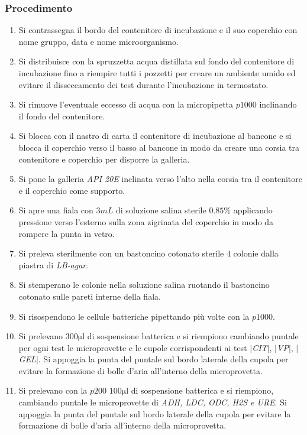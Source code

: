 		\subsubsection{Procedimento}
		\begin{enumerate}
			\item Si contrassegna il bordo del contenitore di incubazione e il suo coperchio con nome gruppo, data e nome microorganismo.
			\item Si distribuisce con la spruzzetta acqua distillata sul fondo del contenitore di incubazione fino a riempire tutti i pozzetti per creare un ambiente umido ed evitare il disseccamento dei test durante l'incubazione in termostato.
			\item Si rimuove l'eventuale eccesso di acqua con la micropipetta $p1000$ inclinando il fondo del contenitore.
			\item Si blocca con il nastro di carta il contenitore di incubazione al bancone e si blocca il coperchio verso il basso al bancone in modo da creare una corsia tra contenitore e coperchio per disporre la galleria.
			\item Si pone la galleria \emph{API 20E} inclinata verso l'alto nella corsia tra il contenitore e il coperchio come supporto.
			\item Si apre una fiala con $3\si{mL}$ di soluzione salina sterile $0.85\%$ applicando pressione verso l'esterno sulla zona zigrinata del coperchio in modo da rompere la punta in vetro.
			\item Si preleva sterilmente con un bastoncino cotonato sterile $4$ colonie dalla piastra di \emph{LB-agar}.
			\item Si stemperano le colonie nella soluzione salina ruotando il bastoncino cotonato sulle pareti interne della fiala.
			\item Si risospendono le cellule batteriche pipettando pi\`u volte con la $p1000$.
			\item Si prelevano $300\si{\micro\litre}$ di sospensione batterica e si riempiono cambiando puntale per ogni test le microprovette e le cupole corrispondenti ai test \emph{$|$CIT$|$}, \emph{$|$VP$|$}, \emph{$|$GEL$|$}.
				Si appoggia la punta del puntale sul bordo laterale della cupola per evitare la formazione di bolle d'aria all'interno della microprovetta.
			\item Si prelevano con la $p200$ $100\si{\micro\litre}$ di sospensione batterica e si riempiono, cambiando puntale le microprovette di \emph{ADH, LDC, ODC, H2S e URE}.
				Si appoggia la punta del puntale sul bordo laterale della cupola per evitare la formazione di bolle d'aria all'interno della microprovetta.

\end{enumerate}

